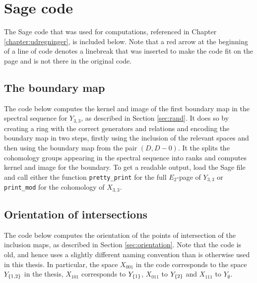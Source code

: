 
\chapter{Sage code} 

The Sage code that was used for computations, referenced in Chapter
\ref{chapter:udregninger}, is included below. Note that a red arrow at
the beginning of a line of code denotes a linebreak that was inserted
to make the code fit on the page and is not there in the original
code.

\section{The boundary map}
\label{sec:sageboundary}

The code below computes the kernel and image of the first boundary map
in the spectral sequence for $Y_{3,3}$, as described in Section
\ref{sec:rand}. It does so by creating a ring with the correct
generators and relations and encoding the boundary map in two steps,
firstly using the inclusion of the relevant spaces and then using the
boundary map from the pair $(D,D-0)$. It the splits the cohomology
groups appearing in the spectral sequence into ranks and computes
kernel and image for the boundary. To get a readable output, load the
Sage file and call either the function \lstinline{pretty_print} for
the full $E_2$-page of $Y_{3,3}$ or \lstinline{print_mod} for the
cohomology of $X_{3,3}$.




\section{Orientation of intersections}
\label{sec:sageorientation}

The code below computes the orientation of the points of intersection
of the inclusion maps, as described in Section
\ref{sec:orientation}. Note that the code is old, and hence uses a
slightly different naming convention than is otherwise used in this
thesis. In particular, the space $X_{001}$ in the code corresponds to
the space $Y_{\left\{ 1,2 \right\}}$ in the thesis, $X_{101}$ corresponds to
$Y_{\left\{ 1 \right\}}$, $X_{011}$ to $Y_{\left\{ 2 \right\}}$ and $X_{111}$ to $Y_{\emptyset}$.




